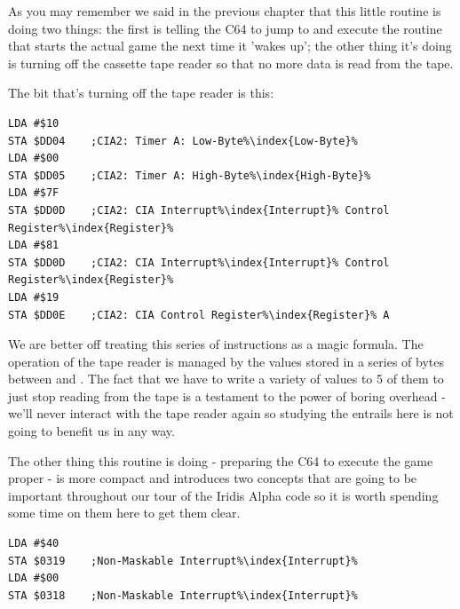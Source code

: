 \begin{minipage}[b]{0.20\linewidth}
\centering

\end{minipage}
\hspace{0.5cm}
\begin{minipage}[b]{0.70\linewidth}
\centering

\end{minipage}

As you may remember we said in the previous chapter that this little routine is doing two things: the first
is telling the C64 to jump to and execute the routine that starts the actual game the next time it 'wakes up'; the
other thing it's doing is turning off the cassette tape reader so that no more data is read from the tape.

The bit that's turning off the tape reader is this:

\begin{lstlisting}[escapechar=\%]
LDA #$10
STA $DD04    ;CIA2: Timer A: Low-Byte%\index{Low-Byte}%
LDA #$00
STA $DD05    ;CIA2: Timer A: High-Byte%\index{High-Byte}%
LDA #$7F
STA $DD0D    ;CIA2: CIA Interrupt%\index{Interrupt}% Control Register%\index{Register}%
LDA #$81
STA $DD0D    ;CIA2: CIA Interrupt%\index{Interrupt}% Control Register%\index{Register}%
LDA #$19
STA $DD0E    ;CIA2: CIA Control Register%\index{Register}% A
\end{lstlisting}

We are better off treating this series of instructions as a magic formula. The operation of the tape reader
is managed by the values stored in a series of bytes between  and . The fact that
we have to write a variety of values to 5 of them to just stop reading from the tape is a testament
to the power of boring overhead - we'll never interact with the tape reader again so studying the entrails
here is not going to benefit us in any way.

The other thing this routine is doing - preparing the C64 to execute the game proper - is more compact and
introduces two concepts that are going to be important throughout our tour of the Iridis Alpha code so it
is worth spending some time on them here to get them clear.

\begin{lstlisting}[caption=Containing two important concepts.,escapechar=\%]
LDA #$40
STA $0319    ;Non-Maskable Interrupt%\index{Interrupt}%
LDA #$00
STA $0318    ;Non-Maskable Interrupt%\index{Interrupt}%
\end{lstlisting}

